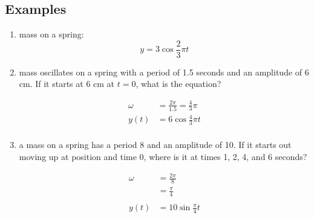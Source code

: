 \documentclass{exam}
\begin{document}
  \subsection{Examples}
  \begin{enumerate}
    \item mass on a spring:
      \[
        y = 3 \cos \frac{2}{3} \pi t
      \]

    \item mass oscillates on a spring with a period of 1.5 seconds and an amplitude of 6 cm.  
      If it starts at 6 cm at $t = 0$, what is the equation?

      \begin{solution}
        \begin{align*}
          \omega & = \frac{2 \pi}{1.5} = \frac{4}{3} \pi \\
          y(t)   & = 6 \cos \frac{4}{3} \pi t \\
        \end{align*}
      \end{solution}

    \item a mass on a spring has a period 8 and an amplitude of 10.  If it starts out moving up at position and time 0,
      where is it at times 1, 2, 4, and 6 seconds?

      \begin{solution}
        \begin{align*}
          \omega & = \frac{2 \pi}{8} \\
                 & = \frac{\pi}{4} \\
          \\
          y(t)   & = 10 \sin \frac{\pi}{4} t \\
        \end{align*}


\end{solution}
\end{enumerate}
\end{document}
